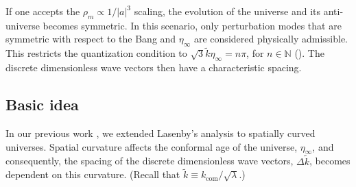 \documentclass[%
 reprint,
 amsmath,amssymb,
 prd, %
]{revtex4-2}
\begin{document}
If one accepts the $\rho_m \propto 1/|a|^3$ scaling, the evolution of the universe and its anti-universe becomes symmetric. In this scenario, only perturbation modes that are symmetric with respect to the Bang and $\eta_\infty$ are considered physically admissible. %
This restricts the quantization condition to $\sqrt{3}\tilde k\eta_\infty=n\pi$, for $n \in \mathbb{N}$ (\cite{2022PhRvD.105h3515B}). %
The discrete dimensionless wave vectors then have a characteristic spacing. %

\subsection{Basic idea}

In our previous work \cite{PhysRevD.110.103528}, we extended Lasenby's analysis \cite{2022PhRvD.105h3514L} to spatially curved universes. %
Spatial curvature affects the conformal age of the universe, $\eta_\infty$, and consequently, the spacing of the discrete dimensionless wave vectors, $\Delta \tilde k$, becomes dependent on this curvature. (Recall that $\tilde k \equiv k_{\mathrm{com}}/\sqrt{\lambda}$.) %
\end{document}
